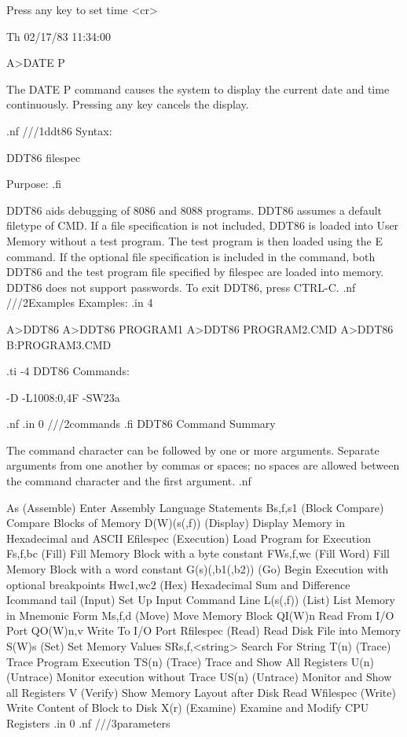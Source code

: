       Press any key to set time <cr>

      Th 02/17/83 11:34:00

      A>DATE P

The DATE P command causes the system to display the current
date and time continuously. Pressing any key cancels the display.

.nf
///1ddt86
Syntax:  

DDT86 {filespec}

Purpose:
.fi

DDT86 aids debugging of 8086 and 8088 programs.  DDT86 assumes
a default filetype of CMD.  If a file specification is not included, 
DDT86 is loaded into User Memory without a test program. The test 
program is then loaded using the E command. If the optional file 
specification is included in the command, both DDT86 and the test 
program file specified by filespec are loaded into memory. DDT86 
does not support passwords.  To exit DDT86, press CTRL-C.
.nf
///2Examples
Examples:
.in 4

A>DDT86
A>DDT86 PROGRAM1
A>DDT86 PROGRAM2.CMD
A>DDT86 B:PROGRAM3.CMD

.ti -4
DDT86 Commands:

-D
-L1008:0,4F
-SW23a
 
.nf
.in 0
///2commands
.fi
DDT86 Command Summary

The command character can be followed by one or more arguments.
Separate arguments from one another by commas or spaces; no spaces 
are allowed between the command character and the first argument. 
.nf

As              (Assemble)      Enter Assembly Language Statements
Bs,f,s1         (Block Compare) Compare Blocks of Memory
D(W)(s(,f))     (Display)       Display Memory in Hexadecimal and ASCII
Efilespec       (Execution)     Load Program for Execution
Fs,f,bc         (Fill)          Fill Memory Block with a byte constant
FWs,f,wc        (Fill Word)     Fill Memory Block with a word constant
G(s)(,b1(,b2))  (Go)            Begin Execution with optional breakpoints
Hwc1,wc2        (Hex)           Hexadecimal Sum and Difference
Icommand tail   (Input)         Set Up Input Command Line
L(s(,f))        (List)          List Memory in Mnemonic Form
Ms,f,d          (Move)          Move Memory Block
QI(W)n                          Read From I/O Port
QO(W)n,v                        Write To I/O Port
Rfilespec       (Read)          Read Disk File into Memory
S(W)s           (Set)           Set Memory Values
SRs,f,<string>                  Search For String
T(n)            (Trace)         Trace Program Execution
TS(n)           (Trace)         Trace and Show All Registers
U(n)            (Untrace)       Monitor execution without Trace
US(n)           (Untrace)       Monitor and Show all Registers
V               (Verify)        Show Memory Layout after Disk Read
Wfilespec       (Write)         Write Content of Block to Disk
X(r)            (Examine)       Examine and Modify CPU Registers
.in 0
.nf
///3parameters

